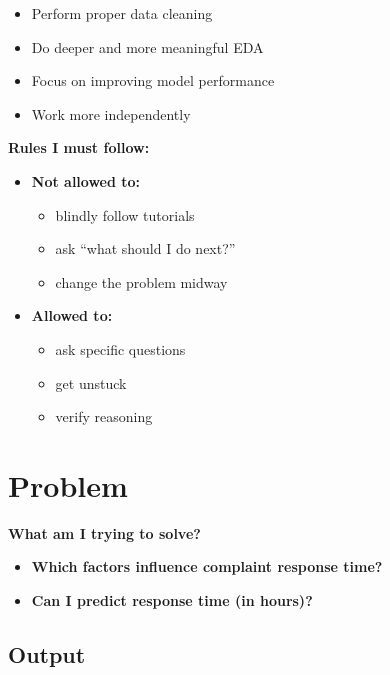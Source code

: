 \documentclass{article}
\begin{document}
\begin{itemize}[leftmargin=*]
    \item Perform proper data cleaning
    \item Do deeper and more meaningful EDA
    \item Focus on improving model performance
    \item Work more independently
\end{itemize}

\vspace{0.5em}

\textbf{Rules I must follow:}

\begin{itemize}[leftmargin=2em]
    \item \textbf{Not allowed to:}
    \begin{itemize}
        \item blindly follow tutorials
        \item ask “what should I do next?”
        \item change the problem midway
    \end{itemize}

    \item \textbf{Allowed to:}
    \begin{itemize}
        \item ask specific questions
        \item get unstuck
        \item verify reasoning
    \end{itemize}
\end{itemize}

\section{Problem}

\vspace{0.5em}

\noindent\Large\textbf{What am I trying to solve?}

\vspace{0.75em}

\begin{itemize}[leftmargin=*]
    \item \textbf{Which factors influence complaint response time?}
    \item \textbf{Can I predict response time (in hours)?}
\end{itemize}

\subsection*{Output}
\end{document}
